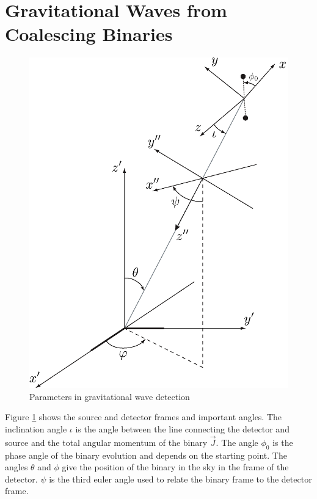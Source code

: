 \documentclass{article}
\begin{document}
\section{Gravitational Waves from Coalescing Binaries}
\begin{figure}[h]
    \centering
    \includegraphics[scale=0.5]{ThesisReport/euler.png}
    \caption{Parameters in gravitational wave detection}
    \label{fig:GWFrameParams}
\end{figure}

Figure \ref{fig:GWFrameParams} shows the
source and detector frames and important angles.  The inclination
angle $\iota$ is the angle between the line connecting the detector
and source and the total angular momentum of the binary $\vec{J}$. The angle $\phi_0$ is the phase angle of the binary evolution and depends on the starting point. The angles $\theta$ and $\phi$ give
the position of the binary in the sky in the frame of the detector.
$\psi$ is the third euler angle used to relate the binary frame to the detector frame. 
\end{document}
